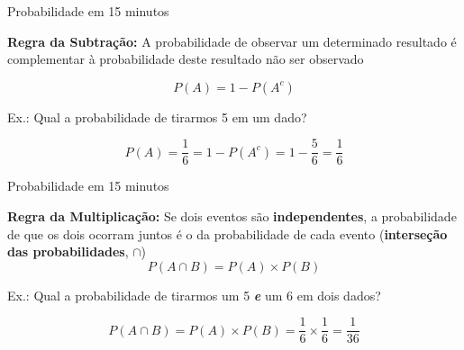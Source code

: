 \documentclass{beamer}\usepackage[]{graphicx}\usepackage[]{color}
\begin{document}
\begin{frame}{Probabilidade em 15 minutos}

\textbf{Regra da Subtração:} A probabilidade de observar um determinado resultado é complementar à probabilidade deste resultado não ser observado


\begin{equation*}
    P(A) = 1 - P(A^c) 
\end{equation*}

\alert{Ex.:} Qual a probabilidade de tirarmos 5 em um dado?


\begin{equation*}
    P(A) = \frac{1}{6} = 1 - P(A^c) = 1 - \frac{5}{6} = \frac{1}{6}
\end{equation*}



\end{frame} 


\begin{frame}{Probabilidade em 15 minutos}

\textbf{Regra da Multiplicação:} Se dois eventos são \textbf{independentes}, a probabilidade de que os dois ocorram juntos é o  da probabilidade de cada evento (\textbf{interseção das probabilidades}, $\cap$)
\begin{equation*}
    P(A \cap B) = P(A) \times P(B)
\end{equation*}

\alert{Ex.:} Qual a probabilidade de tirarmos um 5 \textbf{\emph{e}} um 6 em dois dados?


\begin{equation*}
    P(A \cap B) = P(A) \times P(B) = \frac{1}{6} \times \frac{1}{6} = \frac{1}{36}
\end{equation*}



\end{frame} 
\end{document}
